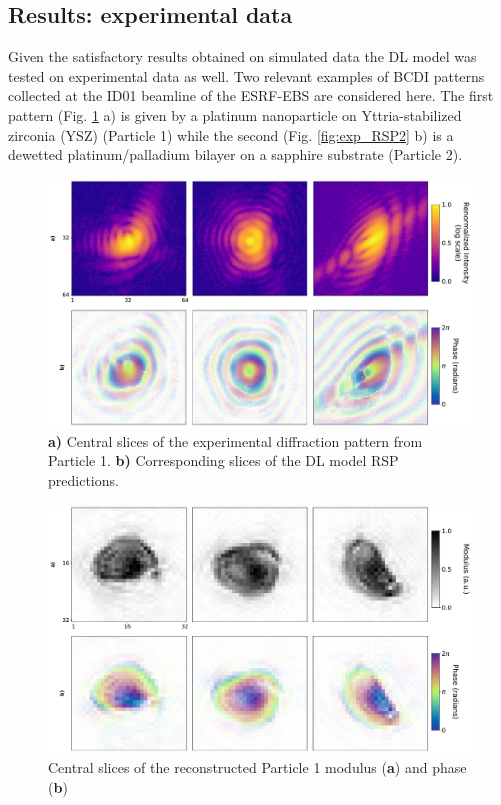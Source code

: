 \subsection{Results: experimental data}\label{chp:phasing_results}
Given the satisfactory results obtained on simulated data the DL model was tested on experimental data as well. 
Two relevant examples of BCDI patterns collected at the ID01 beamline of the ESRF-EBS are considered here. 
The first pattern (Fig. \ref{fig:exp_RSP1} a) is given by a platinum nanoparticle on Yttria-stabilized zirconia (YSZ) 
(Particle 1) while the second (Fig. \ref{fig:exp_RSP2} b) is a dewetted platinum/palladium bilayer on a sapphire substrate
(Particle 2). 

\begin{figure}[H]
    \centering
    \includegraphics[width=\textwidth]{figures/Phasing/exp_data1.pdf}
    \caption{\textbf{a)} Central slices of the experimental diffraction pattern from Particle 1. \textbf{b)} Corresponding 
    slices of the DL model RSP predictions.}
    \label{fig:exp_RSP1}
\end{figure}

\begin{figure}[H]
    \centering
    \includegraphics[width=\textwidth]{figures/Phasing/exp_data_rec1.pdf}
    \caption{Central slices of the reconstructed Particle 1 modulus (\textbf{a}) and phase  (\textbf{b})}
    \label{fig:exp_obj1}
\end{figure}

